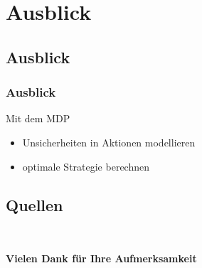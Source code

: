 \documentclass[18pt]{beamer}
\begin{document}
\section{Ausblick}
\subsection{Ausblick}
\begin{frame}
	\frametitle{Ausblick}
	Mit dem MDP
	\begin{itemize}
		\item Unsicherheiten in Aktionen modellieren
		\item optimale Strategie berechnen
	\end{itemize}
\end{frame}

\subsection{Quellen}
\begin{frame}{~}
\begin{center}
\vspace{1.5cm}%
	\textbf{{\LARGE Vielen Dank für Ihre Aufmerksamkeit}}%
\end{center}%
	\begin{multicols}{2}%
	\end{multicols}%
\end{frame}
\end{document}
